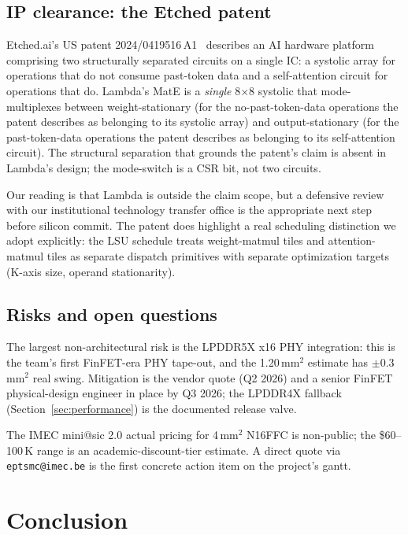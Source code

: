 \documentclass[conference]{IEEEtran}
\begin{document}
\subsection{IP clearance: the Etched patent}

Etched.ai's US patent 2024/0419516\,A1~\cite{etched_patent} describes an AI hardware platform comprising two structurally separated circuits on a single IC: a systolic array for operations that do not consume past-token data and a self-attention circuit for operations that do. Lambda's MatE is a \textit{single} 8$\times$8 systolic that mode-multiplexes between weight-stationary (for the no-past-token-data operations the patent describes as belonging to its systolic array) and output-stationary (for the past-token-data operations the patent describes as belonging to its self-attention circuit). The structural separation that grounds the patent's claim is absent in Lambda's design; the mode-switch is a CSR bit, not two circuits.

Our reading is that Lambda is outside the claim scope, but a defensive review with our institutional technology transfer office is the appropriate next step before silicon commit. The patent does highlight a real scheduling distinction we adopt explicitly: the LSU schedule treats weight-matmul tiles and attention-matmul tiles as separate dispatch primitives with separate optimization targets (K-axis size, operand stationarity).

\subsection{Risks and open questions}

The largest non-architectural risk is the LPDDR5X x16 PHY integration: this is the team's first FinFET-era PHY tape-out, and the 1.20\,mm$^2$ estimate has $\pm 0.3$\,mm$^2$ real swing. Mitigation is the vendor quote (Q2 2026) and a senior FinFET physical-design engineer in place by Q3 2026; the LPDDR4X fallback (Section~\ref{sec:performance}) is the documented release valve.

The IMEC mini@sic 2.0 actual pricing for 4\,mm$^2$ N16FFC is non-public; the \$60--100\,K range is an academic-discount-tier estimate. A direct quote via \texttt{eptsmc@imec.be} is the first concrete action item on the project's gantt.

\section{Conclusion}
\end{document}
